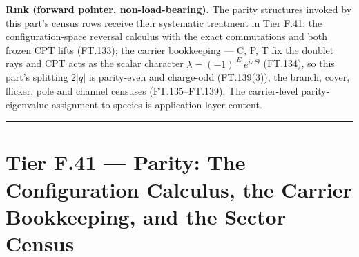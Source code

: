 \begin{theorem}
\textbf{Rmk (forward pointer, non-load-bearing).} The parity structures invoked by this part's census rows receive their systematic treatment in Tier F.41: the configuration-space reversal calculus with the exact commutations and both frozen CPT lifts (FT.133); the carrier bookkeeping — C, P, T fix the doublet rays and CPT acts as the scalar character $\lambda=(-1)^{|E|}e^{i\pi\Theta}$ (FT.134), so this part's splitting $2|q|$ is parity-even and charge-odd (FT.139(3)); the branch, cover, flicker, pole and channel censuses (FT.135–FT.139). The carrier-level parity-eigenvalue assignment to species is application-layer content.

\vspace{2pt}\noindent\rule{\textwidth}{0.4pt}\vspace{2pt}

\end{theorem}

\section[Tier F.41 — Parity: The Configuration Calculus, the Carrier…]{\texorpdfstring{Tier F.41 — Parity: The Configuration Calculus, the Carrier Bookkeeping, and the Sector Census}{Tier F.41 - Parity: The Configuration Calculus, the Carrier Bookkeeping, and the Sector Census}}

